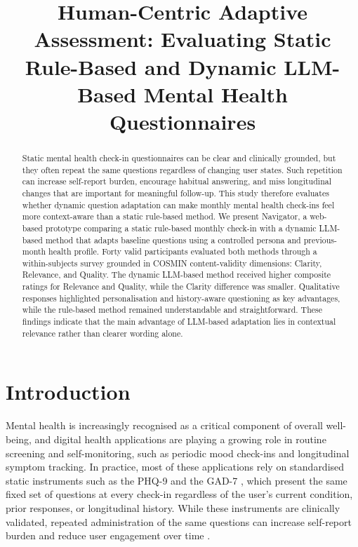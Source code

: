 \documentclass[conference]{IEEEtran}
\title{Human-Centric Adaptive Assessment: Evaluating Static Rule-Based and Dynamic LLM-Based Mental Health Questionnaires}
\author{
  \IEEEauthorblockN{Jaeyun Ree, Khang Huynh, and Zachary Yeap}
  \IEEEauthorblockA{Department of Software Engineering}
}
\begin{document}
\maketitle

\begin{abstract}
Static mental health check-in questionnaires can be clear and clinically
grounded, but they often repeat the same questions regardless of changing
user states. Such repetition can increase self-report burden, encourage
habitual answering, and miss longitudinal changes that are important for
meaningful follow-up. This study therefore evaluates whether dynamic
question adaptation can make monthly mental health check-ins feel more
context-aware than a static rule-based method. We present Navigator, a
web-based prototype comparing a static rule-based monthly check-in with a
dynamic LLM-based method that adapts baseline questions using a controlled
persona and previous-month health profile. Forty valid participants
evaluated both methods through a within-subjects survey grounded in COSMIN
content-validity dimensions: Clarity, Relevance, and Quality. The dynamic
LLM-based method received higher composite ratings for Relevance and Quality, while the Clarity difference was
smaller. Qualitative responses highlighted personalisation
and history-aware questioning as key advantages, while the rule-based
method remained understandable and straightforward. These findings
indicate that the main advantage of LLM-based adaptation lies in
contextual relevance rather than clearer wording alone.
\end{abstract}

\section{Introduction}
\label{sec:intro} 

Mental health is increasingly recognised as a critical component of overall well-being,
and digital health applications are playing a growing role in routine screening and
self-monitoring, such as periodic mood check-ins and longitudinal symptom tracking.
In practice, most of these applications rely on standardised static
instruments such as the PHQ-9 \cite{kroenke2001} and the GAD-7 \cite{spitzer2006},
which present the same fixed set of questions at every check-in regardless of the user's
current condition, prior responses, or longitudinal history. While these instruments
are clinically validated, repeated administration of the same questions can increase
self-report burden and reduce user engagement over time \cite{maatoug2021}.
\end{document}
